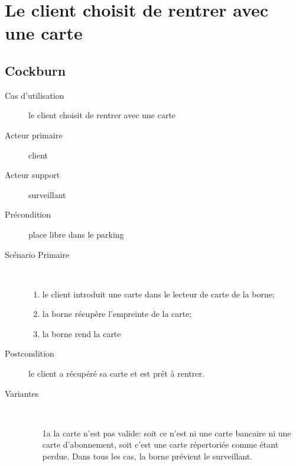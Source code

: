 \documentclass[a4paper]{article}
\begin{document}
\newpage

\section{Le client choisit de rentrer avec une carte}
\subsection{Cockburn}
\begin{description}
	\item[Cas d'utilisation] le client choisit de rentrer avec une carte
	\item[Acteur primaire] client
	\item[Acteur support] surveillant
	\item[Pr\'econdition] place libre dans le parking
	\item[Sc\'enario Primaire] \
	\begin{enumerate}
		\item le client introduit une carte dans le lecteur de carte de la borne;
		\item la borne r\'ecup\`ere l'empreinte de la carte;
		\item la borne rend la carte
	\end{enumerate}
	\item[Postcondition] le client a r\'ecup\'er\'e sa carte et est pr\^et \`a rentrer.
	\item[Variantes] \
	\begin{enumerate}
		\item[1a] la carte n'est pas valide: soit ce n'est ni une carte bancaire
			ni une carte d'abonnement, soit c'est une carte r\'epertori\'ee
			comme \'etant perdue. Dans tous les cas, la borne pr\'evient le
			surveillant.
	\end{enumerate}
\end{description}
\end{document}
